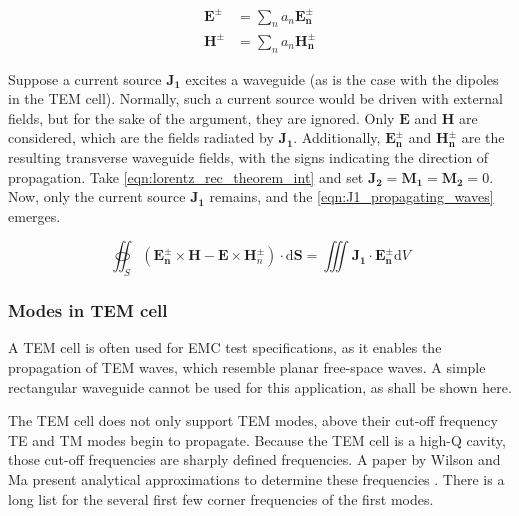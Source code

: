 \begin{align}
    \mathbf{E^\pm}&=\sum_na_n\mathbf{E_n^\pm}    \label{eqn:modal_superposition1}\\
    \mathbf{H^\pm}&=\sum_na_n\mathbf{H_n^\pm}    \label{eqn:modal_superposition2}
\end{align}

Suppose a current source $\mathbf{J_1}$ excites a waveguide (as is the case with the dipoles in the TEM cell). Normally, such a current source would be driven with external fields, but for the sake of the argument, they are ignored. Only $\mathbf{E}$ and $\mathbf{H}$ are considered, which are the fields radiated by $\mathbf{J_1}$. Additionally, $\mathbf{E_n^\pm}$ and $\mathbf{H_n^\pm}$ are the resulting transverse waveguide fields, with the signs indicating the direction of propagation. Take \autoref{eqn:lorentz_rec_theorem_int} and set $\mathbf{J_2}=\mathbf{M_1}=\mathbf{M_2}=0$. Now, only the current source $\mathbf{J_1}$ remains, and the \autoref{eqn:J1_propagating_waves} emerges. %

\begin{equation}
    \oiint _S (\mathbf{E_n^\pm}\times \mathbf{H}-\mathbf{E}\times \mathbf{H}_n^\pm)\cdot\mathrm{d}\mathbf{S}=\iiint \mathbf{J_1}\cdot\mathbf{E_n^\pm}\mathrm{d}V
    \label{eqn:J1_propagating_waves}
\end{equation}

\subsubsection{Modes in TEM cell}

A TEM cell is often used for EMC test specifications, as it enables the propagation of TEM waves, which resemble planar free-space waves. A simple rectangular waveguide cannot be used for this application, as shall be shown here. %

The TEM cell does not only support TEM modes, above their cut-off frequency TE and TM modes begin to propagate. Because the TEM cell is a high-Q cavity, those cut-off frequencies are sharply defined frequencies. A paper by Wilson and Ma present analytical approximations to determine these frequencies \cite{Wilson_Ma_1986}.  There is a long list for the several first few corner frequencies of the first modes.

